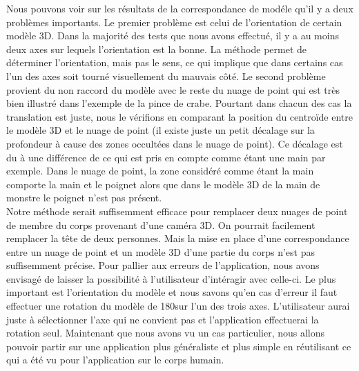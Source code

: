 Nous pouvons voir sur les résultats de la correspondance de modéle qu'il y a deux problèmes importants. Le premier problème est celui de l'orientation
de certain modèle 3D. Dans la majorité des tests que nous avons effectué, il y a au moins deux axes sur lequels l'orientation est la bonne. La méthode 
permet de déterminer l'orientation, mais pas le sens, ce qui implique que dans certains cas l'un des axes soit tourné visuellement du mauvais côté.
Le second problème provient du non raccord du modèle avec le reste du nuage de point qui est très bien illustré dans l'exemple de la pince de crabe.
Pourtant dans chacun des cas la translation est juste, nous le vérifions en comparant la position du centroïde entre le modèle 3D et le nuage de point
(il existe juste un petit décalage sur la profondeur à cause des zones occultées dans le nuage de point). Ce décalage est du à une différence de ce qui est 
pris en compte comme étant une main par exemple. Dans le nuage de point, la zone considéré comme étant la main comporte la main et le poignet alors que 
dans le modèle 3D de la main de monstre le poignet n'est pas présent.\\

Notre méthode serait suffisemment efficace pour remplacer deux nuages de point de membre du corps provenant d'une caméra 3D. On pourrait facilement
remplacer la tête de deux personnes.
Mais la mise en place d'une correspondance entre un nuage de point et un modèle 3D d'une partie du corps n'est pas suffisemment précise. Pour pallier
aux erreurs de l'application, nous avons envisagé de laisser la possibilité à l'utilisateur d'intéragir avec celle-ci. Le plus important est l'orientation
du modèle et nous savons qu'en cas d'erreur il faut effectuer une rotation du modèle de 180\degre sur l'un des trois axes. L'utilisateur aurai juste à 
sélectionner l'axe qui ne convient pas et l'application effectuerai la rotation seul. Maintenant que nous avons vu un cas particulier, nous allons pouvoir
partir sur une application plus généraliste et plus simple en réutilisant ce qui a été vu pour l'application sur le corps humain.  
